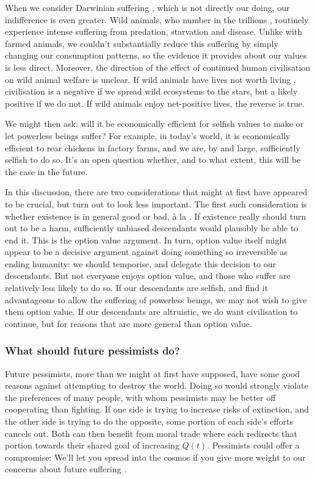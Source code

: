 \documentclass[british]{article}
\begin{document}
{When we consider Darwinian suffering \citep{ng_towards_1995}, which is not directly our doing, our indifference is even greater. Wild animals, who number in the trillions \citep{tomasik_how_2009}, routinely experience intense suffering from predation, starvation and disease. Unlike with farmed animals, we couldn't substantially reduce this suffering by simply changing our consumption patterns, so the evidence it provides about our values is less direct. Moreover, the direction of the effect of continued human civilisation on wild animal welfare is unclear. If wild animals have lives not worth living \citep{tomasik_importance_2015,sittler-adamczewski_consistent_2016}, civilisation is a negative if we spread wild ecosystems to the stars, but a likely positive if we do not. If wild animals enjoy net-positive lives, the reverse is true.}

We might then ask: will it be economically efficient for selfish
values to make or let powerless beings suffer? For example, in today's
world, it is economically efficient to rear chickens in factory farms,
and we are, by and large, sufficiently selfish to do so. It's an open question
whether, and to what extent, this will be the case in the future.

In this discussion, there are two considerations that might at first have appeared to be crucial, but turn out to look less important. The first such consideration is whether existence is in general good or bad, à la \cite{benatar_better_2008}. If existence really should turn out to be a harm, sufficiently unbiased descendants would plausibly be able to end it. This is the option value argument. In turn, option value itself might appear to be a decisive argument against doing something so irreversible as ending humanity: we should temporise, and delegate this decision to our descendants. But not everyone enjoys option value, and those who suffer are relatively less likely to do so. If our descendants are selfish, and find it advantageous to allow the suffering of powerless beings, we may not wish to give them option value. If our descendants are altruistic, we do want civilisation to continue, but for reasons that are more general than option value.

\subsubsection{What should future pessimists do?}
Future pessimists, more than we might at first have supposed, have some good reasons against attempting to destroy the world. Doing so would strongly violate the preferences of many people, with whom pessimists may be better off cooperating than fighting. If one side is trying to increase risks of extinction, and the other side is trying to do the opposite, some portion of each side's efforts cancels out. Both can then benefit from moral trade where each redirects that portion towards their shared goal of increasing $Q(t)$. Pessimists could offer a compromise: We'll let you spread into the cosmos if you give more weight to our concerns about future suffering \citep{tomasik_gains_2013}.
\end{document}
